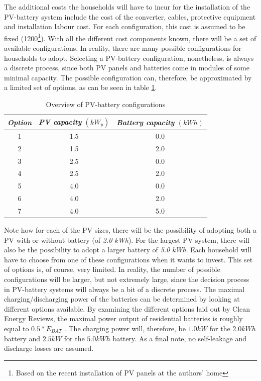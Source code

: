 \newline \newline \noindent
The additional costs the households will have to incur for the installation of the PV-battery system include the cost of the converter, cables, protective equipment and installation labour cost. For each configuration, this cost is assumed to be fixed (\EUR{}1200\footnote{Based on the recent installation of PV panels at the authors' home}). With all the different cost components known, there will be a set of available configurations. In reality, there are many possible configurations for households to adopt. Selecting a PV-battery configuration, nonetheless, is always a discrete process, since both PV panels and batteries come in modules of some minimal capacity. The possible configuration can, therefore, be approximated by a limited set of options, as can be seen in table \ref{tab:config}.
\begin{table}[h!]
    \centering
    \begin{tabular}{||c|c|c||}
    \hline 
          \textbf{\textit{Option}} & \textit{PV capacity} $(kW_p)$ & \textit{Battery capacity} $(kWh)$\\
         \hline 
         \hline
          1 & 1.5 & 0.0\\
          2 & 1.5 & 2.0\\
          3 & 2.5 & 0.0\\
          4 & 2.5 & 2.0\\
          5 & 4.0 & 0.0\\
          6 & 4.0 & 2.0\\
          7 & 4.0 & 5.0\\
          \hline
    \end{tabular}
    \caption{Overview of PV-battery configurations}
    \label{tab:config}
\end{table}
Note how for each of the PV sizes, there will be the possibility of adopting both a PV with or without battery (of \textit{2.0 kWh}). For the largest PV system, there will also be the possibility to adopt a larger battery of \textit{5.0 kWh}. Each household will have to choose from one of these configurations when it wants to invest. This set of options is, of course, very limited. In reality, the number of possible configurations will be larger, but not extremely large, since the decision process in PV-battery systems will always be a bit of a discrete process. 
\newline \newline \noindent
The maximal charging/discharging power of the batteries can be determined by looking at different options available. By examining the different options laid out by Clean Energy Reviews, the maximal power output of residential batteries is roughly equal to $0.5*E_{BAT}$ \cite{batpower}. The charging power will, therefore, be $1.0kW$ for the $2.0 kWh$ battery and $2.5 kW$ for the $5.0 kWh$ battery. As a final note, no self-leakage and discharge losses are assumed. 	
